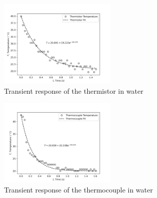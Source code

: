 \begin{figure}[h]
    \centering
    \includegraphics[width=0.5\textwidth]{matplotlib/thermistor_transient_water.png}
    \caption{Transient response of the thermistor in water}
    \label{fig:thermistor_transient_water}
\end{figure}

\begin{figure}[h]
    \centering
    \includegraphics[width=0.5\textwidth]{matplotlib/thermocouple_transient_water.png}
    \caption{Transient response of the thermocouple in water}
    \label{fig:thermocouple_transient_water}
\end{figure}

\FloatBarrier

